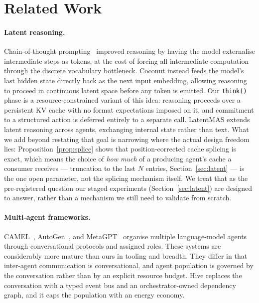 \documentclass[11pt]{article}
\begin{document}
\section{Related Work}

\paragraph{Latent reasoning.}
Chain-of-thought prompting~\cite{wei2022cot} improved reasoning by having the
model externalise intermediate steps as tokens, at the cost of forcing all
intermediate computation through the discrete vocabulary bottleneck. Coconut
\cite{hao2024coconut} instead feeds the model's last hidden state directly back
as the next input embedding, allowing reasoning to proceed in continuous latent
space before any token is emitted. Our \texttt{think()} phase is a
resource-constrained variant of this idea: reasoning proceeds over a persistent
KV cache with no format expectations imposed on it, and commitment to a
structured action is deferred entirely to a separate call. LatentMAS
\cite{latentmas2025} extends latent reasoning across agents, exchanging
internal state rather than text. What we add beyond restating that goal is
narrowing where the actual design freedom lies: Proposition~\ref{prop:splice}
shows that position-corrected cache splicing is exact, which means the choice
of \emph{how much} of a producing agent's cache a consumer receives ---
truncation to the last $N$ entries, Section~\ref{sec:latent} --- is the one
open parameter, not the splicing mechanism itself. We treat that as the
pre-registered question our staged experiments (Section~\ref{sec:latent}) are
designed to answer, rather than a mechanism we still need to validate from
scratch.

\paragraph{Multi-agent frameworks.}
CAMEL~\cite{li2023camel}, AutoGen~\cite{wu2023autogen}, and
MetaGPT~\cite{hong2023metagpt} organise multiple language-model agents through
conversational protocols and assigned roles. These systems are considerably
more mature than ours in tooling and breadth. They differ in that
inter-agent communication is conversational, and agent population is
governed by the conversation rather than by an explicit resource budget. Hive
replaces the conversation with a typed event bus and an orchestrator-owned
dependency graph, and it caps the population with an energy economy.
\end{document}
